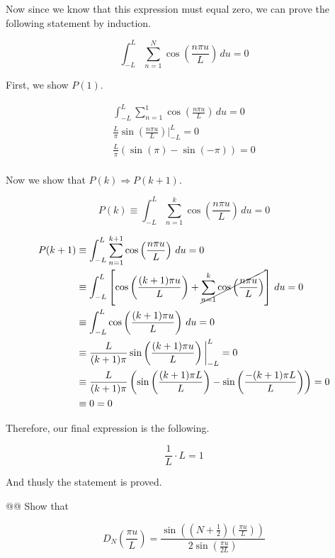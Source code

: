 \documentclass[10pt]{article}
\begin{document}
\begin{easylist}[enumerate]
    Now since we know that this expression must equal zero, we can prove the following statement by induction.

    \[
        \int_{-L}^L \sum_{n=1}^N \cos\left( \frac{n\pi u}{L} \right)\, du = 0
    \]

    First, we show $P(1)$.

    \begin{align*}
        \int_{-L}^L \sum_{n=1}^1 \cos\left( \frac{n\pi u}{L} \right)\, du = 0\\
        \frac{L}{\pi} \sin\left( \frac{n\pi u}{L} \right) \bigg|_{-L}^L = 0\\
        \frac{L}{\pi} \left( \sin(\pi) - \sin(-\pi) \right) = 0\\
    \end{align*}

    Now we show that $P(k) \Rightarrow P(k+1)$.

    \[
        P(k) \equiv \int_{-L}^L \sum_{n=1}^k \cos\left( \frac{n\pi u}{L} \right)\, du = 0
    \]

    \begin{align*}
        P(k + 1) &\equiv \int_{-L}^L \sum_{n=1}^{k+1} \cos\left( \frac{n\pi u}{L} \right)\, du = 0\\
        &\equiv \int_{-L}^L \left[ \cos\left( \frac{(k+1)\pi u}{L} \right) + \cancel{\sum_{n=1}^{k} \cos\left( \frac{n\pi u}{L} \right)} \right]\, du = 0\\
        &\equiv \int_{-L}^L \cos\left( \frac{(k+1)\pi u}{L} \right) \, du = 0\\
        &\equiv \frac{L}{(k+1)\pi} \sin\left( \frac{(k+1)\pi u}{L} \right) \bigg|_{-L}^L = 0\\
        &\equiv \frac{L}{(k+1)\pi} \left( \sin\left( \frac{(k+1)\pi L}{L} \right) - \sin\left( \frac{-(k+1)\pi L}{L} \right) \right) = 0\\
        &\equiv 0 = 0\\
    \end{align*}

    Therefore, our final expression is the following.

    \[
        \frac{1}{L} \cdot L = 1
    \]

    And thusly the statement is proved.

    @@ Show that

    \[
        D_N \left( \frac{\pi u}{L} \right) = \frac{\sin\left( \left( N + \frac{1}{2} \right) \left( \frac{\pi u}{L} \right)\right)}{2 \sin \left( \frac{\pi u}{2L} \right)}
    \]


\end{easylist}
\end{document}
